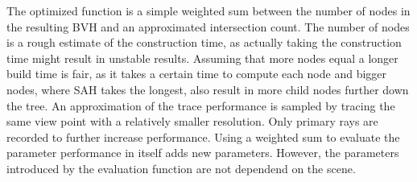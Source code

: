 The optimized function is a simple weighted sum between the number of nodes in the resulting BVH and an approximated intersection count. The number of nodes is a rough estimate of the construction time, as actually taking the construction time might result in unstable results. Assuming that more nodes equal a longer build time is fair, as it takes a certain time to compute each node and bigger nodes, where SAH takes the longest, also result in more child nodes further down the tree. An approximation of the trace performance is sampled by tracing the same view point with a relatively smaller resolution. Only primary rays are recorded to further increase performance. 
Using a weighted sum to evaluate the parameter performance in itself adds new parameters. However, the parameters introduced by the evaluation function are not dependend on the scene. %
